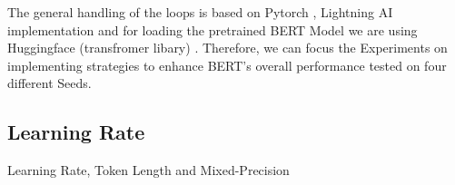 \vspace{0.3cm}

The general handling of the loops is based on Pytorch \cite{noauthor_pytorch_nodate}, Lightning AI \cite{noauthor_lightning_nodate}
implementation and for loading the pretrained BERT Model we are using Huggingface (transfromer libary) \cite{noauthor_hugging_2023}.
Therefore, we can focus the Experiments on implementing strategies to enhance BERT's overall performance tested on four different Seeds.











\newpage
\subsection{Learning Rate}
Learning Rate, Token Length and Mixed-Precision

